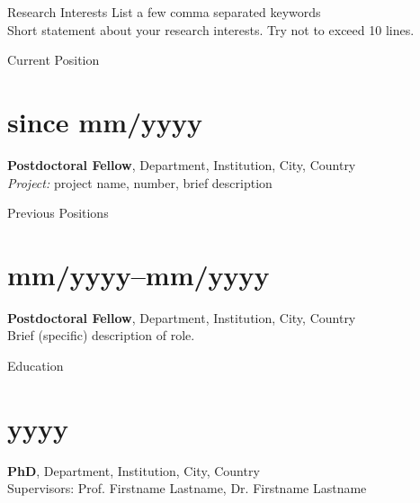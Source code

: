\documentclass[margin,line,10pt]{res}
\begin{document}

\address{firstname.lastname@gmail.com, \url{https://www.akdiem.com}, \url{https://github.com/akdiem}}

\begin{resume}

  {\sc Research Interests} List a few comma separated keywords \\

Short statement about your research interests. Try not to exceed 10 lines.\\

\vspace*{-.2in}

{\sc Current Position}\\
\vspace*{-.35in}
\section{\sc since mm/yyyy}{\bf Postdoctoral Fellow}, Department, Institution, City, Country\\
{\em Project:} project name, number, brief description\\

\vspace*{-.2in}

{\sc Previous Positions}\\
\vspace*{-.35in}
\section{\sc mm/yyyy--mm/yyyy}{\bf Postdoctoral Fellow}, Department, Institution, City, Country\\
Brief (specific) description of role.\\

\vspace*{-.2in}

{\sc Education}\\
\vspace*{-.35in}
\section{\sc yyyy}{\bf PhD}, Department, Institution, City, Country\\
Supervisors: Prof. Firstname Lastname, Dr. Firstname Lastname\\
\vspace*{-.35in}

\end{resume}
\end{document}
